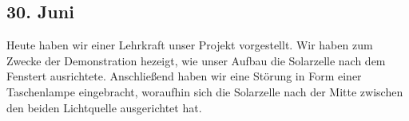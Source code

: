 \subsection{30. Juni}
Heute haben wir einer Lehrkraft unser Projekt vorgestellt. Wir haben zum Zwecke der Demonstration hezeigt, wie unser Aufbau die Solarzelle nach dem Fenstert ausrichtete. Anschließend haben wir eine Störung in Form einer Taschenlampe eingebracht, woraufhin sich die Solarzelle nach der Mitte zwischen den beiden Lichtquelle ausgerichtet hat.
